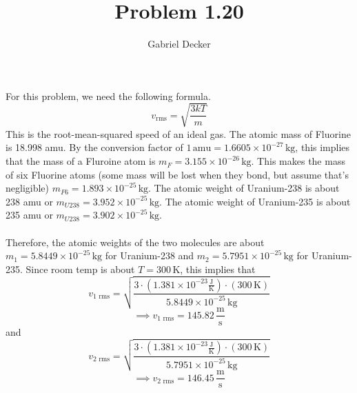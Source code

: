 \documentclass[12pt]{article}
\title{Problem 1.20}
\author{Gabriel Decker}
\newcommand{\unitSpeed}{\frac{\text{m}}{\text{s}}}
\newcommand{\boltzmannConstK}{1.381\times10^{-23}\frac{\text{J}}{\text{K}}}
\begin{document}
\maketitle
\begin{flushleft}

For this problem, we need the following formula.
\begin{equation}
    v_\text{rms}=\sqrt{\frac{3kT}{m}}
\end{equation}
This is the root-mean-squared speed of an ideal gas.
The atomic mass of Fluorine is 18.998 amu.
By the conversion factor of $1\,\text{amu}=1.6605\times10^{-27}\,\text{kg}$, this implies that the mass of a Fluroine atom is $m_F=3.155\times10^{-26}\,\text{kg}$.
This makes the mass of six Fluorine atoms (some mass will be lost when they bond, but assume that's negligible) $m_{F6}=1.893\times10^{-25}\,\text{kg}$.
The atomic weight of Uranium-238 is about 238 amu or $m_{U238}=3.952\times10^{-25}\,\text{kg}$.
The atomic weight of Uranium-235 is about 235 amu or $m_{U238}=3.902\times10^{-25}\,\text{kg}$.\\~\\

Therefore, the atomic weights of the two molecules are about $m_1=5.8449\times10^{-25}\,\text{kg}$ for Uranium-238 and $m_2=5.7951\times10^{-25}\,\text{kg}$ for Uranium-235.
Since room temp is about $T=300\,\text{K}$, this implies that
$$v_\text{1 rms}=\sqrt{\frac{3\cdot(\boltzmannConstK)\cdot(300\,\text{K})}{5.8449\times10^{-25}\,\text{kg}}}$$
$$\implies v_\text{1 rms}=145.82\,\unitSpeed$$
and
$$v_\text{2 rms}=\sqrt{\frac{3\cdot(\boltzmannConstK)\cdot(300\,\text{K})}{5.7951\times10^{-25}\,\text{kg}}}$$
$$\implies v_\text{2 rms}=146.45\,\unitSpeed$$




\end{flushleft}
\end{document}
